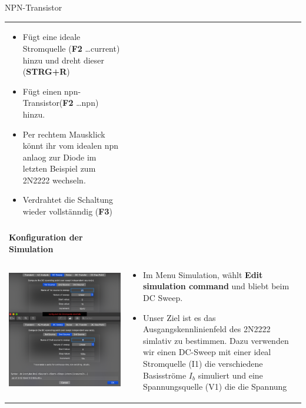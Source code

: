 \begin{frame}[t]{NPN-Transistor}
\begin{spacing}{0.9}
\begin{tiny}
\begin{table}[h!]
\begin{tabular}{p{3cm} p{7cm}}
\begin{minipage}{.7\textwidth}
\begin{itemize}
        \item Fügt eine ideale Stromquelle (\textbf{F2} \dots current) hinzu und dreht dieser (\textbf{STRG+R}) 
        \item Fügt einen npn-Transistor(\textbf{F2} \dots npn) hinzu.
        \item Per rechtem Mausklick könnt ihr vom idealen npn anlaog zur Diode im letzten Beispiel zum 2N2222 wechseln.
        \item Verdrahtet die Schaltung wieder vollstänndig (\textbf{F3})
      \end{itemize}
      \end{minipage} 
      \\
       & \\
       \hline
       \textbf{Konfiguration der Simulation} & \\
       \hline \\
       \begin{minipage}{.3\textwidth}
        \includegraphics[width=0.8\linewidth]{pictures/simulationcmd_3.png}
      \end{minipage} 
      & 
      \begin{minipage}{.7\textwidth}
      \begin{itemize}
        \item Im Menu Simulation, wählt \textbf{Edit simulation command} und bliebt beim DC Sweep. 
        \item Unser Ziel ist es das Ausgangskennlinienfeld des 2N2222 simlativ zu bestimmen. Dazu verwenden wir einen DC-Sweep 
        mit einer ideal Stromquelle (I1) die verschiedene Basisströme $I_b$ simuliert und eine Spannungsquelle (V1) die die Spannung

\end{itemize}
\end{minipage}
\end{tabular}
\end{table}
\end{tiny}
\end{spacing}
\end{frame}
